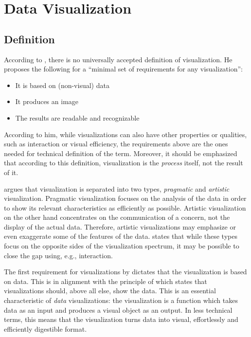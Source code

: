 
\chapter{Data Visualization}
\label{chapter:dataviz}

\section{Definition}

According to \citet[chap.~3]{kosara_visualization_2007}, there is no universally accepted definition of visualization. He proposes the following for a ``minimal set of requirements for any visualization'':

\begin{itemize}
	\item It is based on (non-visual) data
	\item It produces an image
	\item The results are readable and recognizable
\end{itemize}

According to him, while visualizations can also have other properties or qualities, such as interaction or visual efficiency, the requirements above are the ones needed for technical definition of the term. Moreover, it should be emphasized that according to this definition, visualization is the \emph{process} itself, not the result of it.

\citet[chap.~4]{kosara_visualization_2007} argues that visualization is separated into two types, \emph{pragmatic} and \emph{artistic} visualization.  Pragmatic visualization focuses on the analysis of the data in order to show its relevant characteristics as efficiently as possible. Artistic visualization on the other hand concentrates on the communication of a concern, not the display of the actual data. Therefore, artistic visualizations may emphasize or even exaggerate some of the features of the data. \citeauthor{kosara_visualization_2007} states that while these types focus on the opposite sides of the visualization spectrum, it may be possible to close the gap using, e.g., interaction.

The first requirement for visualizations by \citet{kosara_visualization_2007} dictates that the visualization is based on data. This is in alignment with the principle of \citet{tufte_visual_1986} which states that visualizations should, above all else, show the data. This is an essential characteristic of \emph{data} visualizations: the visualization is a function which takes data as an input and produces a visual object as an output. In less technical terms, this means that the visualization turns data into visual, effortlessly and efficiently digestible format. 


